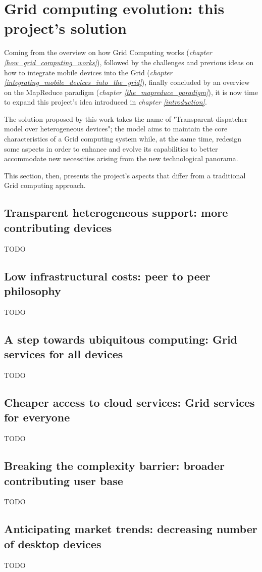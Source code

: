 \section{Grid computing evolution: this project's solution}
Coming from the overview on how Grid Computing works (\textit{chapter \ref{how_grid_computing_works}}), followed by the challenges and previous ideas on how to integrate mobile devices into the Grid (\textit{chapter \ref{integrating_mobile_devices_into_the_grid}}), finally concluded by an overview on the MapReduce paradigm (\textit{chapter \ref{the_mapreduce_paradigm}}), it is now time to expand this project's idea introduced in \textit{chapter \ref{introduction}}.

The solution proposed by this work takes the name of "Transparent dispatcher model over heterogeneous devices"; the model aims to maintain the core characteristics of a Grid computing system while, at the same time, redesign some aspects in order to enhance and evolve its capabilities to better accommodate new necessities arising from the new technological panorama. 

This section, then, presents the project's aspects that differ from a traditional Grid computing approach.

\subsection{Transparent heterogeneous support: more contributing devices}
TODO

\subsection{Low infrastructural costs: peer to peer philosophy}
TODO

\subsection{A step towards ubiquitous computing: Grid services for all devices}
TODO

\subsection{Cheaper access to cloud services: Grid services for everyone}
TODO

\subsection{Breaking the complexity barrier: broader contributing user base}
TODO

\subsection{Anticipating market trends: decreasing number of desktop devices}
TODO